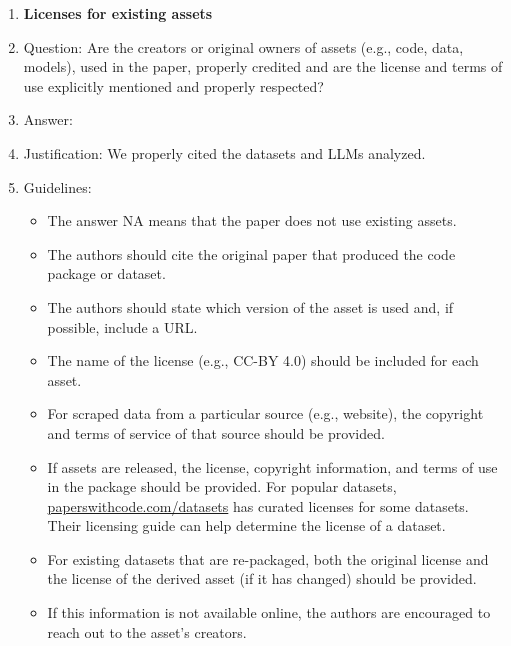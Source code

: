 \documentclass{article}
\begin{document}
\begin{enumerate}
\item {\bf Licenses for existing assets}
    \item[] Question: Are the creators or original owners of assets (e.g., code, data, models), used in the paper, properly credited and are the license and terms of use explicitly mentioned and properly respected?
    \item[] Answer: \answerYes{} %
    \item[] Justification: We properly cited the datasets and LLMs analyzed. 
    \item[] Guidelines:
    \begin{itemize}
        \item The answer NA means that the paper does not use existing assets.
        \item The authors should cite the original paper that produced the code package or dataset.
        \item The authors should state which version of the asset is used and, if possible, include a URL.
        \item The name of the license (e.g., CC-BY 4.0) should be included for each asset.
        \item For scraped data from a particular source (e.g., website), the copyright and terms of service of that source should be provided.
        \item If assets are released, the license, copyright information, and terms of use in the package should be provided. For popular datasets, \url{paperswithcode.com/datasets} has curated licenses for some datasets. Their licensing guide can help determine the license of a dataset.
        \item For existing datasets that are re-packaged, both the original license and the license of the derived asset (if it has changed) should be provided.
        \item If this information is not available online, the authors are encouraged to reach out to the asset's creators.
    \end{itemize}


\end{enumerate}
\end{document}
